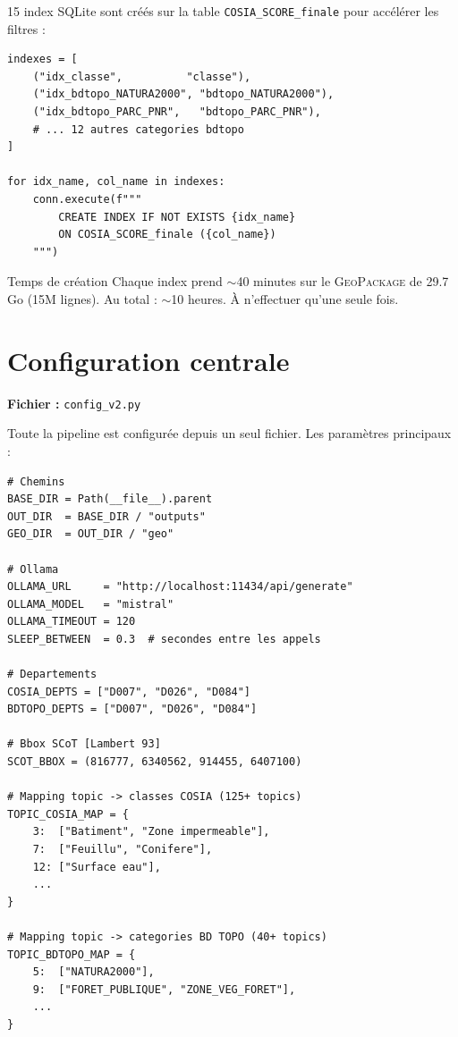 \documentclass[12pt,a4paper]{report}
\newcommand{\code}[1]{\texttt{\small #1}}
\newcommand{\gpkg}{\textsc{GeoPackage}}
\begin{document}
15 index SQLite sont créés sur la table \code{COSIA\_SCORE\_finale} pour accélérer les filtres :

\begin{lstlisting}[language=Python3, caption={Création des index SQLite}]
indexes = [
    ("idx_classe",          "classe"),
    ("idx_bdtopo_NATURA2000", "bdtopo_NATURA2000"),
    ("idx_bdtopo_PARC_PNR",   "bdtopo_PARC_PNR"),
    # ... 12 autres categories bdtopo
]

for idx_name, col_name in indexes:
    conn.execute(f"""
        CREATE INDEX IF NOT EXISTS {idx_name}
        ON COSIA_SCORE_finale ({col_name})
    """)
\end{lstlisting}

\begin{warnbox}{Temps de création}
Chaque index prend $\sim$40 minutes sur le \gpkg{} de 29.7 Go (15M lignes). Au total : $\sim$10 heures. À n'effectuer qu'une seule fois.
\end{warnbox}

\section{Configuration centrale}

\textbf{Fichier :} \code{config\_v2.py}

Toute la pipeline est configurée depuis un seul fichier. Les paramètres principaux :

\begin{lstlisting}[language=Python3, caption={Extraits de config\_v2.py}]
# Chemins
BASE_DIR = Path(__file__).parent
OUT_DIR  = BASE_DIR / "outputs"
GEO_DIR  = OUT_DIR / "geo"

# Ollama
OLLAMA_URL     = "http://localhost:11434/api/generate"
OLLAMA_MODEL   = "mistral"
OLLAMA_TIMEOUT = 120
SLEEP_BETWEEN  = 0.3  # secondes entre les appels

# Departements
COSIA_DEPTS = ["D007", "D026", "D084"]
BDTOPO_DEPTS = ["D007", "D026", "D084"]

# Bbox SCoT [Lambert 93]
SCOT_BBOX = (816777, 6340562, 914455, 6407100)

# Mapping topic -> classes COSIA (125+ topics)
TOPIC_COSIA_MAP = {
    3:  ["Batiment", "Zone impermeable"],
    7:  ["Feuillu", "Conifere"],
    12: ["Surface eau"],
    ...
}

# Mapping topic -> categories BD TOPO (40+ topics)
TOPIC_BDTOPO_MAP = {
    5:  ["NATURA2000"],
    9:  ["FORET_PUBLIQUE", "ZONE_VEG_FORET"],
    ...
}
\end{lstlisting}
\end{document}

